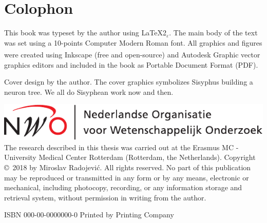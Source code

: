 %
%

\newpage
\setlength{\parindent}{0pt}
\thispagestyle{empty}

\section*{Colophon}

\bigskip
This book was typeset by the author using \LaTeX{}2{\LARGE $_{\varepsilon}$}. The main body of the text was set using a 10-points Computer Modern Roman font. All graphics and figures were created using Inkscape (free and open-source) and Autodesk \textsuperscript{\textregistered}Graphic vector graphics editors and included in the book as Portable Document Format (PDF). %

\bigskip
Cover design by the author. The cover graphics symbolizes Sisyphus building a neuron tree. We all do Sisyphean work now and then.
\bigskip

\vfill
\includegraphics[height=0.07\textheight]{./logos/nwo-nl}
The research described in this thesis was carried out at the Erasmus MC - University Medical Center Rotterdam (Rotterdam, the Netherlands). 
\bigskip
\bigskip
Copyright \copyright\ 2018 by Miroslav Radojevi\'{c}. All rights reserved. No part of this publication may be reproduced or transmitted in any form or by any means, electronic or mechanical, including photocopy, recording, or any information storage and retrieval system, without permission in writing from the author.

\bigskip
ISBN 000-00-0000000-0
\bigskip
Printed by Printing Company
\setlength{\parindent}{\myindent}

